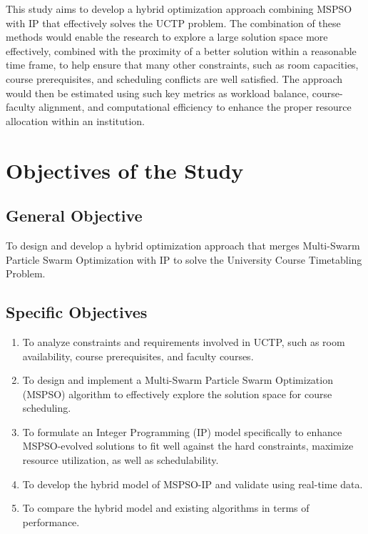 \documentclass{article}
\begin{document}
This study aims to develop a hybrid optimization approach combining MSPSO with IP that effectively solves the UCTP problem. The combination of these methods would enable the research to explore a large solution space more effectively, combined with the proximity of a better solution within a reasonable time frame, to help ensure that many other constraints, such as room capacities, course prerequisites, and scheduling conflicts are well satisfied. The approach would then be estimated using such key metrics as workload balance, course-faculty alignment, and computational efficiency to enhance the proper resource allocation within an institution. 

\section{Objectives of the Study}
\label{sec:objectives}

\subsection{General Objective}
\label{subsec:generalobjective}

To design and develop a hybrid optimization approach that merges Multi-Swarm Particle Swarm Optimization with IP to solve the University Course Timetabling Problem.  

\subsection{Specific Objectives}
\label{subsec:specificobjectives}
\begin{enumerate}
    \item To analyze constraints and requirements involved in UCTP, such as room availability, course prerequisites, and faculty courses.
    \item To design and implement a Multi-Swarm Particle Swarm Optimization (MSPSO) algorithm to effectively explore the solution space for course scheduling. 
    \item To formulate an Integer Programming (IP) model specifically to enhance MSPSO-evolved solutions to fit well against the hard constraints, maximize resource utilization, as well as schedulability.
    \item To develop the hybrid model of MSPSO-IP and validate using real-time data.
    \item To compare the hybrid model and existing algorithms in terms of performance.
\end{enumerate}
\end{document}
